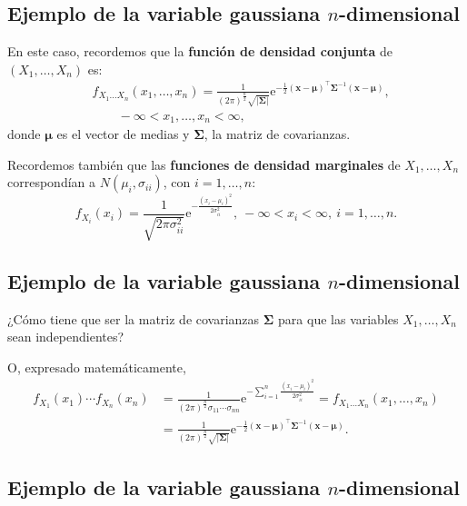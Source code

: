 \documentclass[]{book}
\begin{document}
\hypertarget{ejemplo-de-la-variable-gaussiana-n-dimensional}{%
\subsection{\texorpdfstring{Ejemplo de la variable gaussiana \(n\)-dimensional}{Ejemplo de la variable gaussiana n-dimensional}}\label{ejemplo-de-la-variable-gaussiana-n-dimensional}}

En este caso, recordemos que la \textbf{función de densidad conjunta} de \((X_1,\ldots,X_n)\) es:
\[
\begin{array}{rl}
& f_{X_1\ldots X_n}(x_1,\ldots,x_n)=\frac{1}{(2\pi)^{\frac{n}{2}}\sqrt{\mathbf{|\Sigma|}}}\mathrm{e}^{-\frac{1}{2}(\mathbf{x-\mu})^\top\mathbf{\Sigma}^{-1}(\mathbf{x-\mu})},\\ & \qquad  -\infty <x_1,\ldots,x_n<\infty,
\end{array}
\]
donde \(\mathbf{\mu}\) es el vector de medias y \(\mathbf{\Sigma}\), la matriz de covarianzas.

Recordemos también que las \textbf{funciones de densidad marginales} de \(X_1,\ldots, X_n\) correspondían a \(N(\mu_i,\sigma_{ii})\), con \(i=1,\ldots, n\):
\[
f_{X_i}(x_i)  =\frac{1}{\sqrt{2\pi\sigma_{ii}^2}}\mathrm{e}^{-\frac{(x_i-\mu_i)^2}{2\sigma_{ii}^2}},\ -\infty <x_i<\infty,\ i=1,\ldots,n.
\]

\hypertarget{ejemplo-de-la-variable-gaussiana-n-dimensional-1}{%
\subsection{\texorpdfstring{Ejemplo de la variable gaussiana \(n\)-dimensional}{Ejemplo de la variable gaussiana n-dimensional}}\label{ejemplo-de-la-variable-gaussiana-n-dimensional-1}}

¿Cómo tiene que ser la matriz de covarianzas \(\mathbf{\Sigma}\) para que las variables \(X_1,\ldots,X_n\) sean independientes?

O, expresado matemáticamente,
\[
\begin{array}{rl}
f_{X_1}(x_1)\cdots f_{X_n}(x_n) & =\frac{1}{\left(2\pi\right)^{\frac{n}{2}}\sigma_{11}\cdots \sigma_{nn}}\mathrm{e}^{-\sum\limits_{i=1}^n\frac{(x_i-\mu_i)^2}{2\sigma_{ii}^2}}=f_{X_1\ldots X_n}(x_1,\ldots,x_n) \\ & =\frac{1}{(2\pi)^{\frac{n}{2}}\sqrt{\mathbf{|\Sigma|}}}\mathrm{e}^{-\frac{1}{2}(\mathbf{x-\mu})^\top\mathbf{\Sigma}^{-1}(\mathbf{x-\mu})}.
\end{array}
\]

\hypertarget{ejemplo-de-la-variable-gaussiana-n-dimensional-2}{%
\subsection{\texorpdfstring{Ejemplo de la variable gaussiana \(n\)-dimensional}{Ejemplo de la variable gaussiana n-dimensional}}\label{ejemplo-de-la-variable-gaussiana-n-dimensional-2}}
\end{document}
